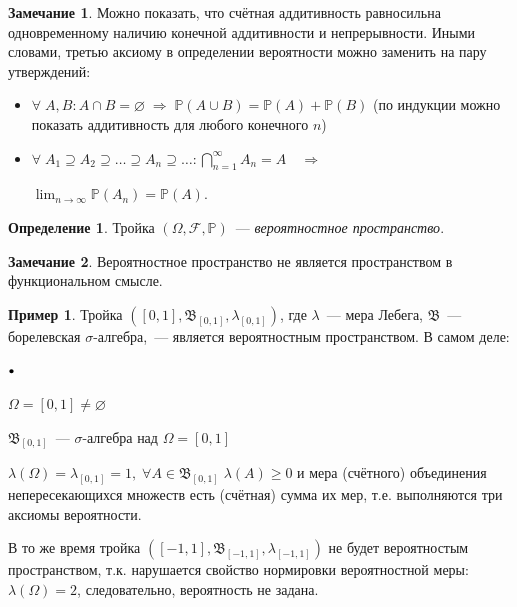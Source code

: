 \documentclass[oneside,final,14pt]{extreport}
\newcommand\myprob[1]{{\mathbb{P}(#1)}}
\theoremstyle{plain}
\theoremstyle{definition}
\newtheorem*{defn}{Определение}
\newtheorem*{exmp}{Пример}
\newtheorem*{rmrk}{Замечание}
\theoremstyle{named}
\newcommand\sbullet[1][.5]{\mathbin{\vcenter{\hbox{\scalebox{#1}{$\bullet$}}}}}
\newenvironment{compactlist}{
\begin{list}{{$\sbullet[.75]$}}{
\setlength\partopsep{0pt}
\setlength\parskip{0pt}
\setlength\parsep{0pt}
\setlength\topsep{0pt}
\setlength\itemsep{0pt}
}
}{
\end{list}
}
\begin{document}
\begin{rmrk}
    Можно показать, что счётная аддитивность равносильна одновременному наличию конечной аддитивности и непрерывности. Иными словами, третью аксиому в определении вероятности можно заменить на пару утверждений:
    \begin{itemize}
        \item $\forall \; A, B \colon A \cap B = \varnothing \; \Rightarrow \; \myprob{A \cup B} = \myprob{A} + \myprob{B}$ (по индукции можно показать аддитивность для любого конечного $n$)
        \item $ \forall \; A_1 \supseteq A_2 \supseteq \ldots \supseteq A_n \supseteq \ldots \colon \bigcap\limits_{n = 1}^{\infty} A_n
       = A \quad \Rightarrow$ 
       
       $\displaystyle \lim_{n \to \infty}\myprob{A_n} = \myprob{A}.$
    \end{itemize}
\end{rmrk}

\begin{defn}
    Тройка $(\Omega, \mathcal{F}, \mathbb{P})$~--- {\it вероятностное пространство}.
\end{defn}
\begin{rmrk}
    Вероятностное пространство не является пространством в функциональном смысле.
\end{rmrk}

\begin{exmp}
    Тройка $([0, 1], \mathfrak{B}_{[0, 1]}, \lambda_{[0, 1]})$, где $\lambda$~--- мера Лебега, $\mathfrak{B}$~--- борелевская $\sigma$-алгебра,~--- является вероятностным пространством. В самом деле:
    \begin{compactlist}
        \item $\Omega = [0, 1] \neq \varnothing$
        \item $\mathfrak{B}_{[0, 1]}$~--- $\sigma$-алгебра над $\Omega = [0, 1]$ 
        \item $\lambda(\Omega) = \lambda_{[0, 1]} = 1, \; \forall A \in \mathfrak{B}_{[0, 1]} \; \lambda(A) \geqslant 0$ и мера (счётного) объединения непересекающихся множеств есть (счётная) сумма их мер, т.е. выполняются три аксиомы вероятности.
    \end{compactlist}
    В то же время тройка $([-1, 1], \mathfrak{B}_{[-1, 1]}, \lambda_{[-1, 1]})$ не будет вероятностым пространством, т.к. нарушается свойство нормировки вероятностной меры: $\lambda(\Omega) = 2$, следовательно, вероятность не задана.
\end{exmp}
\end{document}
